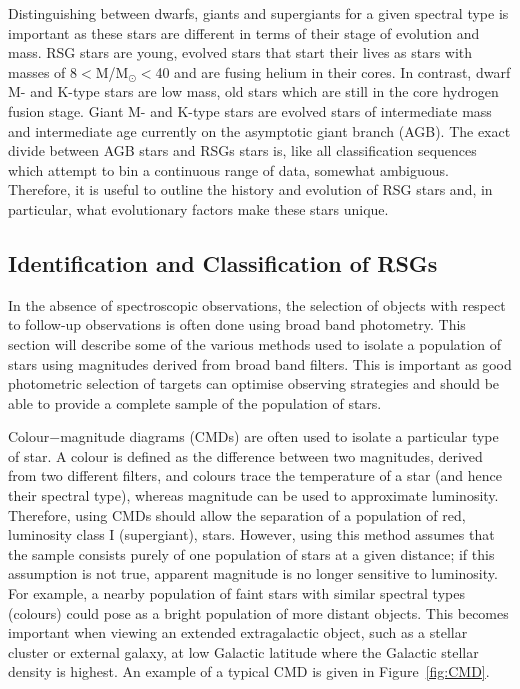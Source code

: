 Distinguishing between dwarfs, giants and supergiants for a given spectral type is important as these stars are different in terms of their stage of evolution and mass.
RSG stars are young, evolved stars that start their lives as stars with masses of 8$<$M/M$_{\odot}<$40 and are fusing helium in their cores.
In contrast, dwarf M- and K-type stars are low mass, old stars which are still in the core hydrogen fusion stage.
Giant M- and K-type stars are evolved stars of intermediate mass and intermediate age currently on the asymptotic giant branch (AGB).
The exact divide between AGB stars and RSGs stars is, like all classification sequences which attempt to bin a continuous range of data, somewhat ambiguous.
Therefore, it is useful to outline the history and evolution of RSG stars and, in particular, what evolutionary factors make these stars unique.

\subsection{Identification and Classification of RSGs} %
\label{sub:selection_of_rsgs}


In the absence of spectroscopic observations, the selection of objects with respect to follow-up observations is often done using broad band photometry.
This section will describe some of the various methods used to isolate a population of stars using magnitudes derived from broad band filters.
This is important as good photometric selection of targets can optimise observing strategies and should be able to provide a complete sample of the population of stars.

Colour$-$magnitude diagrams (CMDs) are often used to isolate a particular type of star.
A colour is defined as the difference between two magnitudes, derived from  two different filters, and colours trace the temperature of a star (and hence their spectral type), whereas magnitude can be used to approximate luminosity.
Therefore, using CMDs should allow the separation of a population of red, luminosity class I (supergiant), stars.
However, using this method assumes that the sample consists purely of one population of stars at a given distance; if this assumption is not true, apparent magnitude is no longer sensitive to luminosity.
For example, a nearby population of faint stars with similar spectral types (colours) could pose as a bright population of more distant objects.
This becomes important when viewing an extended extragalactic object, such as a stellar cluster or external galaxy, at low Galactic latitude where the Galactic stellar density is highest.
An example of a typical CMD is given in Figure~\ref{fig:CMD}.

